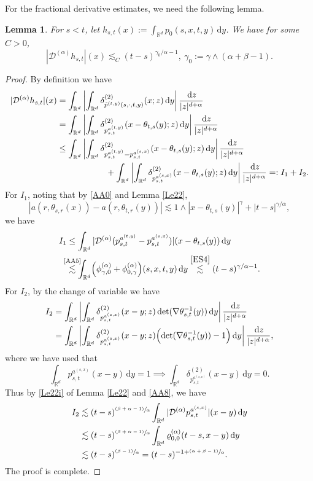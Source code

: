 \documentclass[11pt]{article}
\numberwithin{equation}{section}\providecommand{\asymp}{\mathrel{\sim}}
\newcommand{\psfrac}[2]{\sfrac{(#1)}{#2}}
\newcommand{\sm}[1]{\makebox[0pt][c]{\scriptsize#1}}
\theoremstyle{plain}
\newtheorem{lemma}[theorem]{Lemma}
\theoremstyle{definition}
\newcommand\cD{{\mathcal D}}
\newcommand\mR{\mathbb{R}}
\newcommand\1{{\mathbf{1}}}
\newcommand{\dif}{\,\mathrm{d}}
\begin{document}
For the fractional derivative estimates, we need the following lemma.
\begin{lemma}\label{Le34}
For $s<t$, let $h_{s,t}(x):=\int_{\mR^d}p_0(s,x,t,y)\dif y$. We have for some $C>0$,
\[
|\cD^{(\alpha)}h_{s,t}|(x)\lesssim_C(t-s)^{\gamma_0/\alpha-1},\ \gamma_0:=\gamma \wedge (\alpha+\beta-1).
\]
\end{lemma}
\begin{proof}
By definition we have
\begin{align*}
|\cD^{(\alpha)}h_{s,t}|(x)
&=\int_{\mR^d}\left|\int_{\mR^d}\delta^{(2)}_{\tilde p^{(t,y)}(s,\cdot,t,y)}(x;z)\dif y\right|\frac{\dif z}{|z|^{d+\alpha}}
\\&=\int_{\mR^d}\left|\int_{\mR^d}\delta^{(2)}_{p_{{s,t}}^{a^{(t,y)}}}(x-\theta_{t,s}(y);z)\dif y\right|\frac{\dif z}{|z|^{d+\alpha}}
\\&\leq\int_{\mR^d}\left|\int_{\mR^d}\delta^{(2)}_{p_{{s,t}}^{a^{(t,y)}}-p_{{s,t}}^{a^{(s,x)}}} (x-\theta_{t,s}(y);z)\dif y\right|\frac{\dif z}{|z|^{d+\alpha}}
\\&\hspace*{2cm}+\int_{\mR^d}\left|\int_{\mR^d}\delta^{(2)}_{p_{{s,t}}^{a^{(s,x)}}}(x-\theta_{t,s}(y);z)\dif y\right|\frac{\dif z}{|z|^{d+\alpha}}=:I_1+I_2.
\end{align*}
For $I_1$, noting that by \eqref{AA0} and Lemma \ref{Le22},
\[
|a(r,\theta_{s,r}(x))-a(r,\theta_{t,r}(y))|\lesssim 1\wedge |x-\theta_{t,s}(y)|^{\gamma}+|t-s|^{\gamma/\alpha},
\]
we have
\begin{align*}
I_1&\leq\int_{\mR^d}|\cD^{(\alpha)}(p_{s,t}^{a^{(t,y)}}-p_{s,t}^{a^{(s,x)}})|(x-\theta_{t,s}(y))\dif y
\\&\overset{\sm{\eqref{AA5}}}{\lesssim}\int_{\mR^d}\Bigl(\phi^{(\alpha)}_{\gamma,0}+\phi^{(\alpha)}_{0,\gamma}\Bigr)(s,x,t,y)\dif y
\overset{\eqref{ES4}}{\lesssim} (t-s)^{\gamma/\alpha-1}.
\end{align*}
For $I_2$, by the change of variable we have
\begin{align*}
I_2&=\int_{\mR^d}\left|\int_{\mR^d}\delta^{(2)}_{p_{s,t}^{a^{(s,x)}}}(x-y;z)\det(\nabla\theta^{-1}_{s,t}(y))\dif y\right|\frac{\dif z}{|z|^{d+\alpha}}
\\&=\int_{\mR^d}\left|\int_{\mR^d}\delta^{(2)}_{p_{s,t}^{a^{(s,x)}}}(x-y;z)\Bigl(\det(\nabla\theta^{-1}_{s,t}(y))-1\Bigr)\dif y\right|\frac{\dif z}{|z|^{d+\alpha}},
\end{align*}
where we have used that
\[
\int_{\mR^d}p_{s,t}^{a^{(s,x)}} (x-y)\dif y=1\implies \int_{\mR^d}\delta^{(2)}_{p_{s,t}^{a^{(s,x)}}}(x-y)\dif y=0.
\]
Thus by \eqref{Le22i} of Lemma \ref{Le22} and \eqref{AA8}, we have
\begin{align*}
I_2&\lesssim(t-s)^{\psfrac{\beta+\alpha-1}{\alpha}}\int_{\mR^d}|\cD^{(\alpha)}p_{s,t}^{a^{(s,x)}}|(x-y)\dif y
\\&\lesssim(t-s)^{\psfrac{\beta+\alpha-1}{\alpha}}\int_{\mR^d}\varrho^{(\alpha)}_{0,0}(t-s,x-y)\dif y\\
&\lesssim(t-s)^{\psfrac{\beta-1}{\alpha}}=(t-s)^{-1+\psfrac{\alpha+\beta-1}{\alpha}}.
\end{align*}
The proof is complete.
\end{proof}
\end{document}
